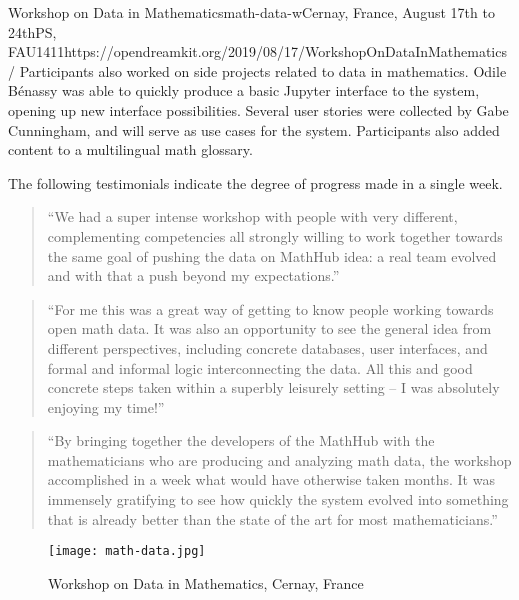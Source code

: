 \begin{event}{Workshop on Data in Mathematics}{math-data-w}{Cernay, France, August 17th to 24th}{PS, FAU}{14}{11}{https://opendreamkit.org/2019/08/17/WorkshopOnDataInMathematics/}
Participants also worked on side projects related to data in mathematics.
Odile Bénassy was able to quickly produce a basic Jupyter interface to the system,
opening up new interface possibilities.
Several user stories were collected by Gabe Cunningham, and will serve as use cases for the system.
Participants also added content to a multilingual math glossary.

The following testimonials indicate the degree of progress made in a single week.

\begin{quote}
``We had a super intense workshop with people with very different, complementing competencies all strongly willing to work together towards the same goal of pushing the data on MathHub idea: a real team evolved and with that a push beyond my expectations.''
\end{quote}

\begin{quote}
``For me this was a great way of getting to know people working towards open math data. It was also an opportunity to see the general idea from different perspectives, including concrete databases, user interfaces, and formal and informal logic interconnecting the data. All this and good concrete steps taken within a superbly leisurely setting -- I was absolutely enjoying my time!''
\end{quote}

\begin{quote}
``By bringing together the developers of the MathHub with the mathematicians who are producing and analyzing math data, the workshop accomplished in a week what would have otherwise taken months. It was immensely gratifying to see how quickly the system evolved into something that is already better than the state of the art for most mathematicians.''
\end{quote}

\begin{figure}[ht]
\texttt{[image: math-data.jpg]}
\caption*{Workshop on Data in Mathematics, Cernay, France}
\end{figure}

\end{event}
